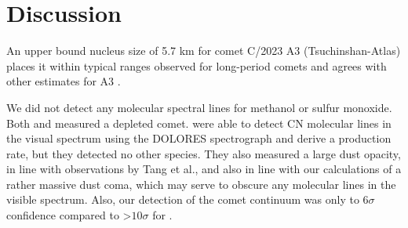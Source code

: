 \section{Discussion}\label{discussion}

An upper bound nucleus size of 5.7 km for comet C/2023 A3 (Tsuchinshan-Atlas) places it within typical ranges observed for
long-period comets and agrees with other estimates for A3 \citep{Meech2004, Liu2025}.

We did not detect any molecular spectral lines for methanol or sulfur monoxide. Both \cite{Tang2024} and \cite{Cambianica2025} measured a depleted comet. \cite{Cambianica2025} were able to detect CN molecular lines in the visual spectrum using the DOLORES spectrograph and derive a production rate, but they detected no other species. They also measured a large dust opacity, in line with observations by Tang et al., and also in line with our calculations of a rather massive dust coma, which may serve to obscure any molecular lines in the visible spectrum. Also, our detection of the comet continuum was only to \(6\sigma\) confidence compared to \textgreater\(10\sigma\) for \cite{Lellouch2022}.
